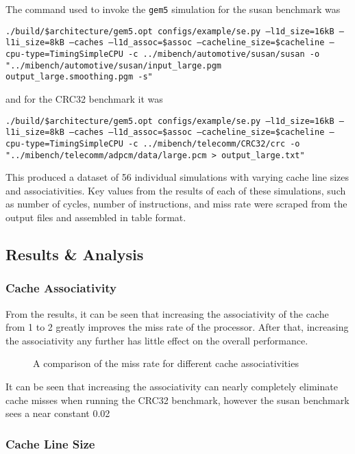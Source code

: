 The command used to invoke the \texttt{gem5} simulation for the susan benchmark was

\texttt{./build/\${architecture}/gem5.opt configs/example/se.py --l1d\_size=16kB --l1i\_size=8kB --caches --l1d\_assoc=\${assoc} --cacheline\_size=\${cacheline} --cpu-type=TimingSimpleCPU -c ../mibench/automotive/susan/susan -o "../mibench/automotive/susan/input\_large.pgm output\_large.smoothing.pgm -s"}

and for the CRC32 benchmark it was

\texttt{./build/\${architecture}/gem5.opt configs/example/se.py --l1d\_size=16kB --l1i\_size=8kB --caches --l1d\_assoc=\${assoc} --cacheline\_size=\${cacheline} --cpu-type=TimingSimpleCPU -c ../mibench/telecomm/CRC32/crc -o "../mibench/telecomm/adpcm/data/large.pcm > output\_large.txt"}

This produced a dataset of 56 individual simulations with varying cache line sizes and 
associativities.
Key values from the results of each of these simulations, such as number of cycles, 
number of instructions, and miss rate were scraped from the output files and assembled 
in table format.

\subsection{Results \& Analysis}

\subsubsection{Cache Associativity}

From the results, it can be seen that increasing the associativity of the cache from 
1 to 2 greatly improves the miss rate of the processor. After that, increasing the 
associativity any further has little effect on the overall performance.

\begin{figure}[H]
    \centering
    
    \caption{A comparison of the miss rate for different cache associativities}
    \label{fig:partb-assoc}
\end{figure}

It can be seen that increasing the associativity can nearly completely eliminate 
cache misses when running the CRC32 benchmark, however the susan benchmark sees a near 
constant 0.02%

\subsubsection{Cache Line Size}

